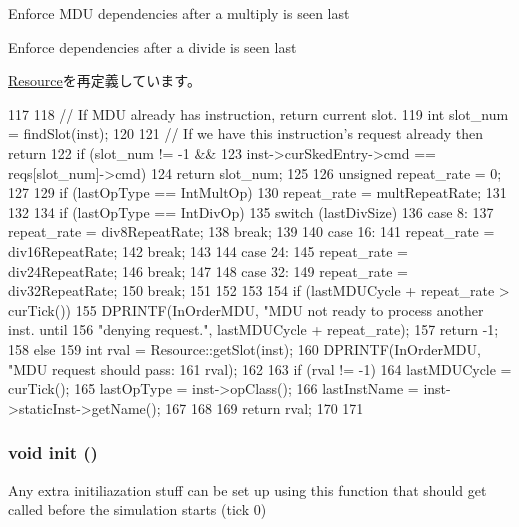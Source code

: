 Enforce MDU dependencies after a multiply is seen last

Enforce dependencies after a divide is seen last 

\hyperlink{classResource_ab3ba2ee95c723c8c056db0a1f2a6dfd3}{Resource}を再定義しています。


\begin{DoxyCode}
117 {
118     // If MDU already has instruction, return current slot.
119     int slot_num = findSlot(inst);
120 
121     // If we have this instruction's request already then return
122     if (slot_num != -1 &&         
123         inst->curSkedEntry->cmd == reqs[slot_num]->cmd)
124         return slot_num;
125     
126     unsigned repeat_rate = 0;
127 
129     if (lastOpType == IntMultOp) {
130         repeat_rate = multRepeatRate;
131     }
132 
134     if (lastOpType == IntDivOp) {
135         switch (lastDivSize) {
136           case 8:
137             repeat_rate = div8RepeatRate;
138             break;
139 
140           case 16:
141             repeat_rate = div16RepeatRate;
142             break;
143 
144           case 24:
145             repeat_rate = div24RepeatRate;
146             break;
147 
148           case 32:
149             repeat_rate = div32RepeatRate;
150             break;
151         }
152     }
153 
154     if (lastMDUCycle + repeat_rate > curTick()) {
155         DPRINTF(InOrderMDU, "MDU not ready to process another inst. until %
156                 "denying request.\n", lastMDUCycle + repeat_rate);
157         return -1;
158     } else {
159         int rval = Resource::getSlot(inst);
160         DPRINTF(InOrderMDU, "MDU request should pass: %
161                 rval);
162 
163         if (rval != -1) {            
164             lastMDUCycle = curTick();
165             lastOpType = inst->opClass();
166             lastInstName = inst->staticInst->getName();
167         }
168       
169         return rval;
170     }
171 }
\end{DoxyCode}
\hypertarget{classMultDivUnit_a02fd73d861ef2e4aabb38c0c9ff82947}{
\subsubsection[{init}]{\setlength{\rightskip}{0pt plus 5cm}void init ()}}
\label{classMultDivUnit_a02fd73d861ef2e4aabb38c0c9ff82947}
Any extra initiliazation stuff can be set up using this function that should get called before the simulation starts (tick 0) 

